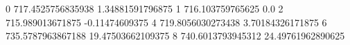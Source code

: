 0 717.4525756835938 1.34881591796875
1 716.103759765625 0.0
2 715.989013671875 -0.11474609375
4 719.8056030273438 3.70184326171875
6 735.5787963867188 19.47503662109375
8 740.6013793945312 24.49761962890625
